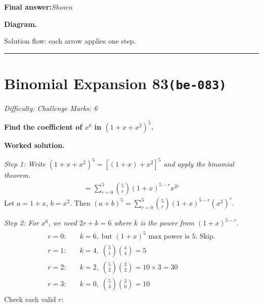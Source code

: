\documentclass[11pt]{article}
\newcommand{\question}[1]{\par\medskip\noindent\textbf{#1}\par}
\begin{document}
\begin{answerbox}
\textbf{Final answer:}\quad \(\displaystyle Shown\)
\end{answerbox}
\textbf{Diagram.}

\begin{center}
\end{center}
\small Solution flow: each arrow applies one step.\normalsize

\medskip\hrule

\section*{Binomial Expansion 83\quad\small\texttt{(be-083)}}
\textit{Difficulty: Challenge \quad\textbar\quad Marks: 6}

\question{Find the coefficient of \( x^6 \) in \( (1 + x + x^2)^5 \).}

\textbf{Worked solution.}

\textit{Step 1: Write \((1 + x + x^2)^5 = [(1+x) + x^2]^5\) and apply the binomial theorem.}
\[\begin{gathered}
= \sum_{r=0}^{5} \binom{5}{r} (1+x)^{5-r} x^{2r}
\end{gathered}\]
Let \(a = 1+x\), \(b = x^2\). Then \((a+b)^5 = \sum_{r=0}^{5} \binom{5}{r} (1+x)^{5-r} (x^2)^r\).

\textit{Step 2: For \(x^6\), we need \(2r + k = 6\) where \(k\) is the power from \((1+x)^{5-r}\).}
\[\begin{gathered}
\begin{aligned} r=0:& \quad k=6,\; \text{but } (1+x)^5 \text{ max power is 5. Skip.} \\ r=1:& \quad k=4,\; \binom{5}{1}\binom{4}{4} = 5 \\ r=2:& \quad k=2,\; \binom{5}{2}\binom{3}{2} = 10 \times 3 = 30 \\ r=3:& \quad k=0,\; \binom{5}{3}\binom{2}{0} = 10 \end{aligned}
\end{gathered}\]
Check each valid \(r\):
\end{document}
